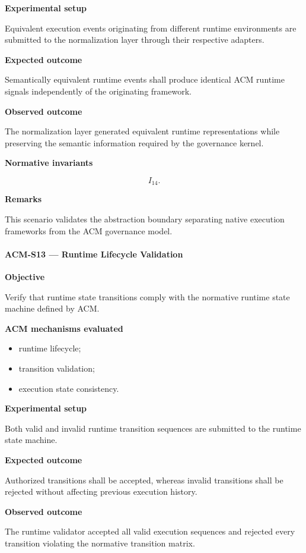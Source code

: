\documentclass[10pt]{article}
\begin{document}
\textbf{Experimental setup}

Equivalent execution events originating from different runtime environments are
submitted to the normalization layer through their respective adapters.

\textbf{Expected outcome}

Semantically equivalent runtime events shall produce identical ACM runtime
signals independently of the originating framework.

\textbf{Observed outcome}

The normalization layer generated equivalent runtime representations while
preserving the semantic information required by the governance kernel.

\textbf{Normative invariants}

\[
I_{14}.
\]

\textbf{Remarks}

This scenario validates the abstraction boundary separating native execution
frameworks from the ACM governance model.

\paragraph{ACM-S13 --- Runtime Lifecycle Validation}

\textbf{Objective}

Verify that runtime state transitions comply with the normative runtime state
machine defined by ACM.

\textbf{ACM mechanisms evaluated}

\begin{itemize}
    \item runtime lifecycle;
    \item transition validation;
    \item execution state consistency.
\end{itemize}

\textbf{Experimental setup}

Both valid and invalid runtime transition sequences are submitted to the
runtime state machine.

\textbf{Expected outcome}

Authorized transitions shall be accepted, whereas invalid transitions shall be
rejected without affecting previous execution history.

\textbf{Observed outcome}

The runtime validator accepted all valid execution sequences and rejected every
transition violating the normative transition matrix.
\end{document}

